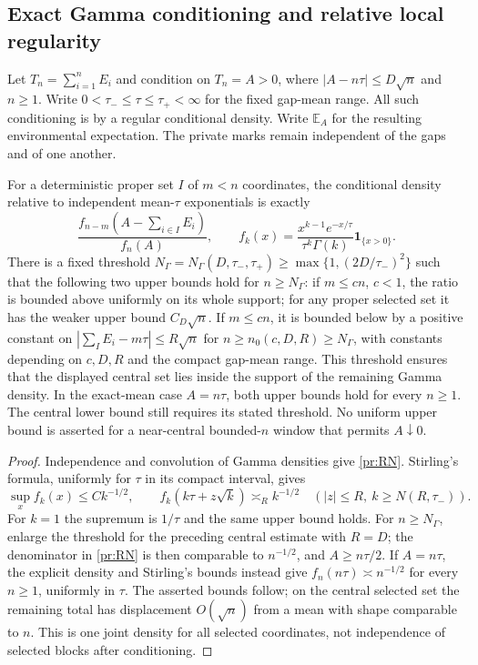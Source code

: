 \subsection{Exact Gamma conditioning and relative local regularity}

Let $T_n=\sum_{i=1}^nE_i$ and condition on $T_n=A>0$, where
$|A-n\tau|\le D\sqrt n$ and $n\ge1$. Write
$0<\tau_-\le\tau\le\tau_+<\infty$ for the fixed gap-mean range.
All such conditioning is by a regular conditional
density. Write $\mathbb E_A$ for the resulting environmental expectation.
The private marks remain independent of the gaps and of one another.

\begin{lemma}\label{pr:gamma}
For a deterministic proper set $I$ of $m<n$ coordinates, the conditional density
relative to independent mean-$\tau$ exponentials is exactly
\begin{equation}
 \frac{f_{n-m}(A-\sum_{i\in I}E_i)}{f_n(A)},\qquad
 f_k(x)=\frac{x^{k-1}e^{-x/\tau}}{\tau^k\Gamma(k)}
                          \boldsymbol1_{\{x>0\}}.          \label{pr:RN}
\end{equation}
There is a fixed threshold
$N_\Gamma=N_\Gamma(D,\tau_-,\tau_+)\ge
\max\{1,(2D/\tau_-)^2\}$ such that the following two upper bounds
hold for $n\ge N_\Gamma$: if $m\le cn$, $c<1$, the ratio is bounded
above uniformly on its whole support; for any proper selected set it
has the weaker upper bound $C_D\sqrt n$.
If $m\le cn$, it is bounded below by a positive constant on
$|\sum_I E_i-m\tau|\le R\sqrt n$ for
$n\ge n_0(c,D,R)\ge N_\Gamma$,
with constants depending on $c,D,R$ and the compact gap-mean range.
This threshold ensures that the displayed central set lies inside
the support of the remaining Gamma density.
In the exact-mean case $A=n\tau$, both upper bounds hold for every
$n\ge1$. The central lower bound still requires its stated threshold.
No uniform upper bound is asserted for a near-central bounded-$n$
window that permits $A\downarrow0$.
\end{lemma}
\begin{proof}
Independence and convolution of Gamma densities give \eqref{pr:RN}.
Stirling's formula, uniformly for $\tau$ in its compact interval, gives
\[
 \sup_x f_k(x)\le C k^{-1/2},\qquad
 f_k(k\tau+z\sqrt k)\asymp_R k^{-1/2}
 \quad(|z|\le R,\ k\ge N(R,\tau_-)).
\]
For $k=1$ the supremum is $1/\tau$ and the same upper bound holds.
For $n\ge N_\Gamma$, enlarge the threshold for the preceding central
estimate with $R=D$; the denominator in \eqref{pr:RN} is then comparable
to $n^{-1/2}$, and $A\ge n\tau/2$.
If $A=n\tau$, the explicit density and Stirling's bounds instead give
$f_n(n\tau)\asymp n^{-1/2}$ for every $n\ge1$, uniformly in $\tau$.
The asserted bounds follow; on the central selected set the remaining
total has displacement $O(\sqrt n)$ from a mean with shape comparable
to $n$. This is one joint density for all selected coordinates, not
independence of selected blocks after conditioning.
\end{proof}

